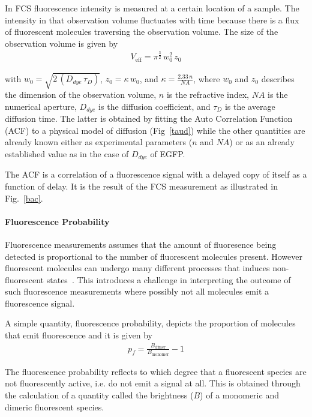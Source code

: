 In FCS fluorescence intensity is measured at a certain location of a sample. 
The intensity in that observation volume fluctuates with time because there is a flux of fluorescent molecules traversing the observation volume. 
The size of the observation volume is given by 
\begin{align} 
V_{\text{eff}} = \pi^{\frac{3}{2}}\,w_{0}^{2}\,z_{0}
\label{eqn:veff}
\end{align}

with $w_{0} = \sqrt{2\,(D_{dye}\,\tau_{D})}$, $z_{0} = \kappa\,w_{0}$, and $\kappa = \frac{2.33\,n}{NA}$, where $w_{0}$ and $z_{0}$ describes the dimension of the observation volume, $n$ is the refractive index, $NA$ is the numerical aperture, $D_{dye}$ is the diffusion coefficient, and $\tau_{D}$ is the average diffusion time. 
The latter is obtained by fitting the Auto Correlation Function (ACF) to a physical model of diffusion (Fig~\ref{taud}) while the other quantities are already known either as experimental parameters ($n$ and $NA$) or as an already established value as in the case of $D_{dye}$ of EGFP.

The ACF is a correlation of a fluorescence signal with a delayed copy of itself as a function of delay. 
It is the result of the FCS measurement as illustrated in Fig.~\ref{bac}. 

\paragraph{Fluorescence Probability}
Fluorescence measurements assumes that the amount of fluoresence being detected is proportional to the number of fluorescent molecules present. 
However fluorescent molecules can undergo many different processes that induces non-fluorescent states~\cite{Dunsing2018}. 
This introduces a challenge in interpreting the outcome of such fluorescence measurements where possibly not all molecules emit a fluorescence signal.  

A simple quantity, fluorescence probability, depicts the proportion of molecules that emit fluorescence and it is given by 
\begin{align}
p_{f}= \frac{B_{\text{dimer}}}{B_{\text{monomer}}}-1
\label{eqn:pf}
\end{align}

The fluorescence probability reflects to which degree that a fluorescent species are not fluorescently active, i.e. do not emit a signal at all. 
This is obtained through the calculation of a quantity called the brightness ($B$) of a monomeric and dimeric fluorescent species.

